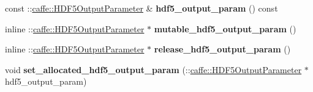 \begin{DoxyCompactItemize}
const \+::\mbox{\hyperlink{classcaffe_1_1_h_d_f5_output_parameter}{caffe\+::\+H\+D\+F5\+Output\+Parameter}} \& {\bfseries hdf5\+\_\+output\+\_\+param} () const
\item 
\mbox{\label{classcaffe_1_1_v0_layer_parameter_a4458ab797e2866bfa78ea75aa75c56e8}} 
inline \+::\mbox{\hyperlink{classcaffe_1_1_h_d_f5_output_parameter}{caffe\+::\+H\+D\+F5\+Output\+Parameter}} $\ast$ {\bfseries mutable\+\_\+hdf5\+\_\+output\+\_\+param} ()
\item 
\mbox{\label{classcaffe_1_1_v0_layer_parameter_a53f80bea786124a76b18fa3bd0d6b205}} 
inline \+::\mbox{\hyperlink{classcaffe_1_1_h_d_f5_output_parameter}{caffe\+::\+H\+D\+F5\+Output\+Parameter}} $\ast$ {\bfseries release\+\_\+hdf5\+\_\+output\+\_\+param} ()
\item 
\mbox{\label{classcaffe_1_1_v0_layer_parameter_a25f1bee20425c0afd3fb87736450c172}} 
void {\bfseries set\+\_\+allocated\+\_\+hdf5\+\_\+output\+\_\+param} (\+::\mbox{\hyperlink{classcaffe_1_1_h_d_f5_output_parameter}{caffe\+::\+H\+D\+F5\+Output\+Parameter}} $\ast$hdf5\+\_\+output\+\_\+param)
\end{DoxyCompactItemize}
